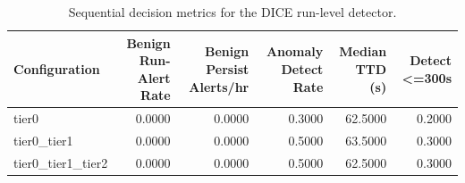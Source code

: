 \begin{table}[t]
\centering
\caption{Sequential decision metrics for the DICE run-level detector.}
\label{tab:dice_sequential_metrics}
\footnotesize
\begin{tabular}{lrrrrr}
\toprule
Configuration & Benign Run-Alert Rate & Benign Persist Alerts/hr & Anomaly Detect Rate & Median TTD (s) & Detect <=300s \\
\midrule
tier0 & 0.0000 & 0.0000 & 0.3000 & 62.5000 & 0.2000 \\
tier0_tier1 & 0.0000 & 0.0000 & 0.5000 & 63.5000 & 0.3000 \\
tier0_tier1_tier2 & 0.0000 & 0.0000 & 0.5000 & 62.5000 & 0.3000 \\
\bottomrule
\end{tabular}

\end{table}
